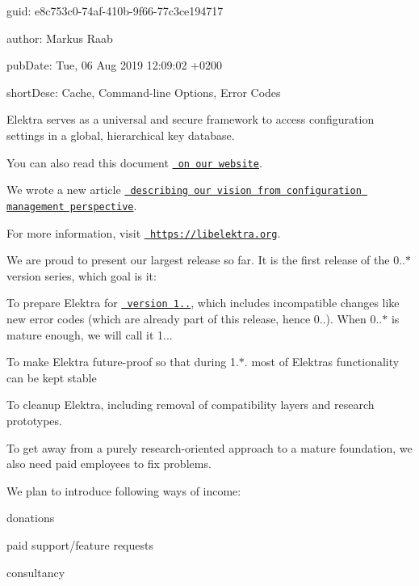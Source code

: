 
\begin{DoxyItemize}
\item guid\+: e8c753c0-\/74af-\/410b-\/9f66-\/77c3ce194717
\item author\+: Markus Raab
\item pub\+Date\+: Tue, 06 Aug 2019 12\+:09\+:02 +0200
\item short\+Desc\+: Cache, Command-\/line Options, Error Codes
\end{DoxyItemize}

Elektra serves as a universal and secure framework to access configuration settings in a global, hierarchical key database.

You can also read this document \href{https://www.libelektra.org/news/0.9.0-release}{\texttt{ on our website}}.

We wrote a new article \href{https://www.libelektra.org/docgettingstarted/vision}{\texttt{ describing our vision from configuration management perspective}}.

For more information, visit \href{https://libelektra.org}{\texttt{ https\+://libelektra.\+org}}.

We are proud to present our largest release so far. It is the first release of the 0..$\ast$ version series, which goal is it\+:


\begin{DoxyItemize}
\item To prepare Elektra for \href{https://github.com/ElektraInitiative/libelektra/milestone/12}{\texttt{ version 1..}}, which includes incompatible changes like new error codes (which are already part of this release, hence 0..). When 0..$\ast$ is mature enough, we will call it 1...
\item To make Elektra future-\/proof so that during 1.$\ast$. most of Elektra\textquotesingle{}s functionality can be kept stable
\item To cleanup Elektra, including removal of compatibility layers and research prototypes.
\end{DoxyItemize}

To get away from a purely research-\/oriented approach to a mature foundation, we also need paid employees to fix problems.

We plan to introduce following ways of income\+:


\begin{DoxyEnumerate}
\item donations
\item paid support/feature requests
\item consultancy
\end{DoxyEnumerate}

